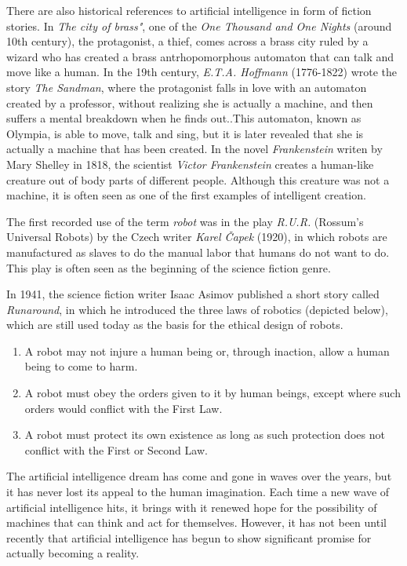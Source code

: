 There are also historical references to artificial intelligence in form of fiction stories. In \textit{The city of brass"}, one of the \textit{One Thousand and One Nights} (around 10th century), the protagonist, a thief, comes across a brass city ruled by a wizard who has created a brass antrhopomorphous automaton that can talk and move like a human. In the 19th century, \textit{E.T.A. Hoffmann} (1776-1822) wrote the story \textit{The Sandman}, where the protagonist falls in love with an automaton created by a professor, without realizing she is actually a machine, and then suffers a mental breakdown when he finds out..This automaton, known as Olympia, is able to move, talk and sing, but it is later revealed that she is actually a machine that has been created. In the novel \textit{Frankenstein} writen by Mary Shelley in 1818, the scientist \textit{Victor Frankenstein} creates a human-like creature out of body parts of different people. Although this creature was not a machine, it is often seen as one of the first examples of intelligent creation.


The first recorded use of the term \textit{robot} was in the play \textit{R.U.R.} (Rossum’s Universal Robots) by the Czech writer \textit{Karel Čapek} (1920), in which robots are manufactured as slaves to do the manual labor that humans do not want to do. This play is often seen as the beginning of the science fiction genre.

In 1941, the science fiction writer Isaac Asimov published a short story called \textit{Runaround}, in which he introduced the three laws of robotics (depicted below), which are still used today as the basis for the ethical design of robots.


\begin{enumerate}

	\item A robot may not injure a human being or, through inaction, allow a human being to come to harm.

	\item A robot must obey the orders given to it by human beings, except where such orders would conflict with the First Law.

	\item A robot must protect its own existence as long as such protection does not conflict with the First or Second Law.

\end{enumerate}

The artificial intelligence dream has come and gone in waves over the years, but it has never lost its appeal to the human imagination. Each time a new wave of artificial intelligence hits, it brings with it renewed hope for the possibility of machines that can think and act for themselves. However, it has not been until recently that artificial intelligence has begun to show significant promise for actually becoming a reality.

